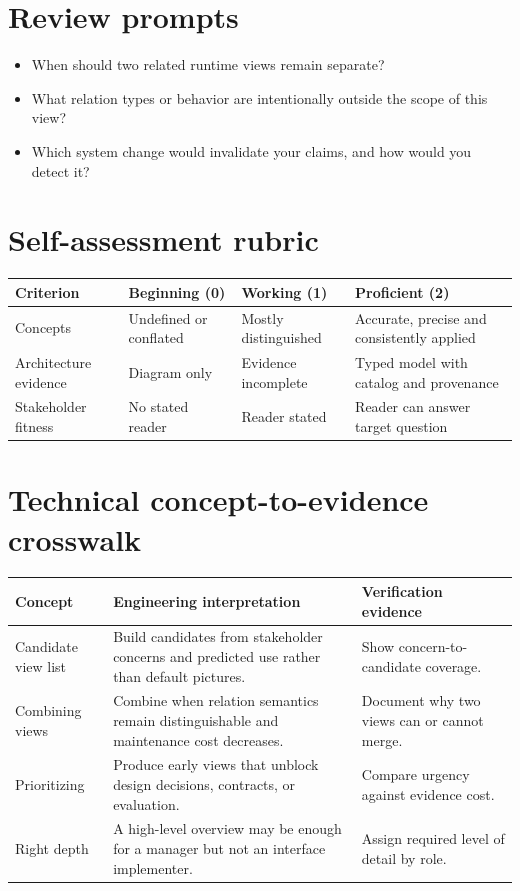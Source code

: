 \documentclass[10pt,letterpaper]{article}
\begin{document}
\section{Review prompts}
\begin{itemize}
\item When should two related runtime views remain separate?
\item What relation types or behavior are intentionally outside the scope of this view?
\item Which system change would invalidate your claims, and how would you detect it?
\end{itemize}
\section{Self-assessment rubric}
\small
\begin{tabularx}{\linewidth}{@{}YYYY@{}}
\toprule
\textbf{Criterion} & \textbf{Beginning (0)} & \textbf{Working (1)} & \textbf{Proficient (2)} \\
\midrule
Concepts & Undefined or conflated & Mostly distinguished & Accurate, precise and consistently applied \\
Architecture evidence & Diagram only & Evidence incomplete & Typed model with catalog and provenance \\
Stakeholder fitness & No stated reader & Reader stated & Reader can answer target question \\
\bottomrule
\end{tabularx}
\normalsize
\section{Technical concept-to-evidence crosswalk}
\small
\begin{tabularx}{\linewidth}{@{}YYY@{}}
\toprule
\textbf{Concept} & \textbf{Engineering interpretation} & \textbf{Verification evidence} \\
\midrule
Candidate view list & Build candidates from stakeholder concerns and predicted use rather than default pictures. & Show concern-to-candidate coverage. \\
Combining views & Combine when relation semantics remain distinguishable and maintenance cost decreases. & Document why two views can or cannot merge. \\
Prioritizing & Produce early views that unblock design decisions, contracts, or evaluation. & Compare urgency against evidence cost. \\
Right depth & A high-level overview may be enough for a manager but not an interface implementer. & Assign required level of detail by role. \\
\bottomrule
\end{tabularx}
\normalsize
\end{document}
